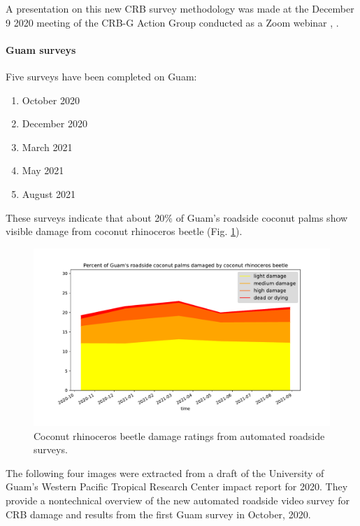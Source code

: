 \documentclass[12pt,letterpaper,english,bibliography=totocnumbered,abstract=on]{scrartcl}
\begin{document}
A presentation on this new CRB survey methodology was made at the December 9 2020 meeting of the CRB-G Action Group conducted as a Zoom webinar \cite{mooreVideoRecordingCRBG2020}, \cite{mooreAutomatedRoadsideVideo2020}.

\paragraph{Guam surveys}

Five surveys have been completed on Guam:
\begin{enumerate}
	\item October 2020 \cite{mooreCRBDamageWebmap2020} 
	\item December 2020 \cite{mooreCRBDamageWebmap2020a}
	\item March 2021 \cite{mooreCRBDamageWebmap2021}
	\item May 2021 \cite{mooreCRBDamageWebmap2021a}
	\item August 2021 \cite{mooreCRBDamageWebmap2021b}	
\end{enumerate}

\newpage

These surveys indicate that about 20\% of Guam's roadside coconut palms show visible damage from coconut rhinoceros beetle (Fig. \ref{fig:timeline}).

\begin{figure}[h]
	\centering
	\includegraphics[width=0.7\linewidth]{images/timeline}
	\caption{Coconut rhinoceros beetle damage ratings from automated roadside surveys.}
	\label{fig:timeline}
\end{figure}






The following four images were extracted from a draft of the University of Guam's Western Pacific Tropical Research Center impact report for 2020. They provide a nontechnical overview of the new automated roadside video survey for CRB damage and results from the first Guam survey in October, 2020.
\end{document}
